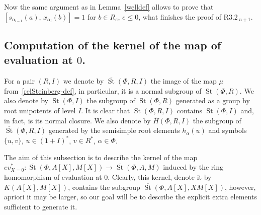 \documentclass[oneside, 8pt]{amsart}
\theoremstyle{remark}
\theoremstyle{definition}
\DeclareMathOperator{\St}{St}
\numberwithin{equation}{section}
\begin{document}
Now the same argument as in Lemma~\ref{welldef} allows to prove that $[s_{\alpha_{l-1}}(a),\,x_{\alpha_l}(b)]=1$ for $b\in R_e$, $e\leq0$, what finishes the proof of R3.2$\!\,_{n+1}$.

\subsection{Computation of the kernel of the map of evaluation at $0$.}
For a pair $(R, I)$ we denote by $\overline{\St}(\Phi, R, I)$ the image of the map $\mu$ from~\eqref{relSteinberg-def}, in particular, it is a normal subgroup of $\St(\Phi, R)$.
We also denote by $\St(\Phi, I)$ the subgroup of $\St(\Phi, R)$ generated as a group by root unipotents of level $I$.
It is clear that $\overline{\St}(\Phi, R, I)$ contains $\St(\Phi, I)$ and, in fact, is its normal closure.
We also denote by $\overline{H}(\Phi, R, I)$ the subgroup of $\overline{\St}(\Phi, R, I)$ generated by the semisimple root elements $h_\alpha(u)$ and symbols $\{u, v\}$, $u \in (1+I)^*$, $v \in R^*$, $\alpha\in \Phi$.

The aim of this subsection is to describe the kernel of the map $ev_{X=0}^*\colon\overline{\St}(\Phi, A[X], M[X]) \to \overline{\St}(\Phi, A, M)$
induced by the ring homomorphism of evaluation at $0$. Clearly, this kernel, denote it by $K(A[X], M[X])$, contains the subgroup $\overline{\St}(\Phi, A[X], XM[X])$, however, apriori it may be larger, so our goal will be to describe the explicit extra elements sufficient to generate it.
\end{document}
